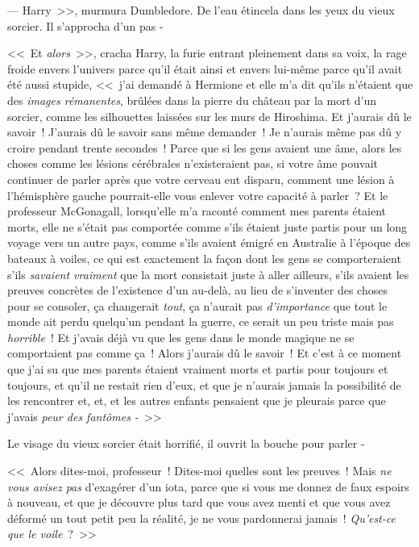 --- Harry~>>, murmura Dumbledore. De l'eau étincela dans les yeux du vieux sorcier. Il s'approcha d'un pas -

<<~Et \emph{alors}~>>, cracha Harry, la furie entrant pleinement dans sa voix, la rage froide envers l'univers parce qu'il était ainsi et envers lui-même parce qu'il avait été aussi stupide, <<~j'ai demandé à Hermione et elle m'a dit qu'ils n'étaient que des \emph{images rémanentes}, brûlées dans la pierre du château par la mort d'un sorcier, comme les silhouettes laissées sur les murs de Hiroshima. Et j'aurais dû le savoir~! J'aurais dû le savoir sans même demander~! Je n'aurais même pas dû y croire pendant trente secondes~! Parce que si les gens avaient une âme, alors les choses comme les lésions cérébrales n'existeraient pas, si votre âme pouvait continuer de parler après que votre cerveau eut disparu, comment une lésion à l'hémisphère gauche pourrait-elle vous enlever votre capacité à parler~? Et le professeur McGonagall, lorsqu'elle m'a raconté comment mes parents étaient morts, elle ne s'était pas comportée comme s'ils étaient juste partis pour un long voyage vers un autre pays, comme s'ils avaient émigré en Australie à l'époque des bateaux à voiles, ce qui est exactement la façon dont les gens se comporteraient s'ils \emph{savaient vraiment} que la mort consistait juste à aller ailleurs, s'ils avaient les preuves concrètes de l'existence d'un au-delà, au lieu de s'inventer des choses pour se consoler, ça changerait \emph{tout}, ça n'aurait pas \emph{d'importance} que tout le monde ait perdu quelqu'un pendant la guerre, ce serait un peu triste mais pas \emph{horrible}~! Et j'avais déjà vu que les gens dans le monde magique ne se comportaient pas comme ça~! Alors j'aurais dû le savoir~! Et c'est à ce moment que j'ai su que mes parents étaient vraiment morts et partis pour toujours et toujours, et qu'il ne restait rien d'eux, et que je n'aurais jamais la possibilité de les rencontrer et, et, et les autres enfants pensaient que je pleurais parce que j'avais \emph{peur des fantômes -}~>>

Le visage du vieux sorcier était horrifié, il ouvrit la bouche pour parler -

<<~Alors dites-moi, professeur~! Dites-moi quelles sont les preuves~! Mais \emph{ne vous avisez pas} d'exagérer d'un iota, parce que si vous me donnez de faux espoirs à nouveau, et que je découvre plus tard que vous avez menti et que vous avez déformé un tout petit peu la réalité, je ne vous pardonnerai jamais~! \emph{Qu'est-ce que le voile}~?~>>

